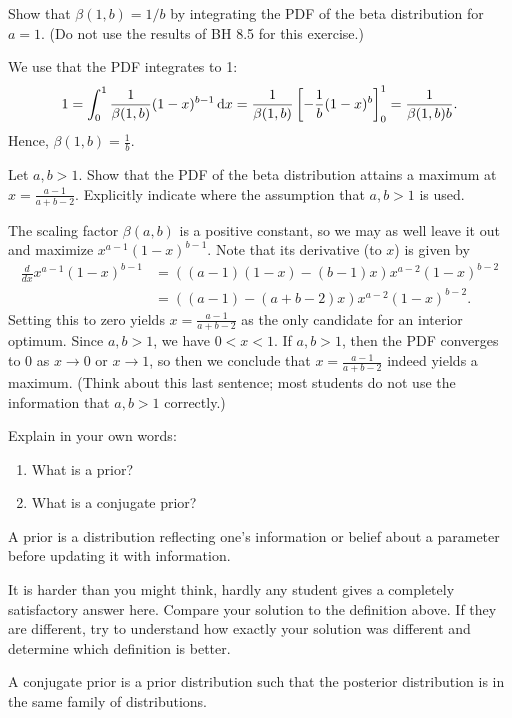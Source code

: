 \begin{exercise}
Show that $\beta(1, b) = 1/b$ by integrating the PDF of the beta distribution for $a=1$. (Do not use the results of BH 8.5 for this exercise.)
\begin{solution}
We use that the PDF integrates to 1:
$$1 = \int_0^1 \frac1{\beta(1,b)} (1-x)^{b-1} \,\textrm{d}x =  \frac1{\beta(1,b)}  \left[-\frac{1}{b}(1-x)^{b}\right]_0^1 =  \frac{1}{\beta(1,b) b}.$$
Hence, $\beta(1, b) = \frac1b$.
\end{solution}
\end{exercise}

\begin{exercise}
Let $a, b > 1$. Show that the PDF of the beta distribution attains a maximum at $x = \frac{a-1}{a+b-2}$. Explicitly indicate where the assumption that  $a, b > 1$ is used.
\begin{solution}
The scaling factor $\beta(a, b)$ is a positive constant, so we may as well leave it out and maximize $x^{a-1}(1-x)^{b-1}$. Note that its derivative (to $x$) is given by
\begin{align*}
\frac{d}{dx} x^{a-1}(1-x)^{b-1} &= ((a-1)(1-x) -(b-1)x)x^{a-2}(1-x)^{b-2} \\ &= ((a-1) - (a+b-2)x) x^{a-2}(1-x)^{b-2}.
\end{align*}
Setting this to zero yields $x = \frac{a-1}{a+b-2}$ as the only candidate for an interior optimum. Since $a, b > 1$, we have $0 < x < 1$. If  $a, b > 1$, then the PDF converges to 0 as $x \to 0$ or $x \to 1$, so then we conclude that $x = \frac{a-1}{a+b-2}$ indeed yields a maximum. (Think about this last sentence; most students do not use the information that $a,b>1$ correctly.)
\end{solution}
\end{exercise}


\begin{exercise}
Explain in your own words:
\begin{enumerate}
\item What is a prior?
\item What is a conjugate prior?
\end{enumerate}
\begin{solution}
A prior is a distribution reflecting one's information or belief about a parameter before updating it with information.

It is harder than you might think, hardly any student gives a completely satisfactory answer here. Compare your solution to the definition above. If they are different, try to understand how exactly your solution was different and determine which definition is better.

A conjugate prior is a prior distribution such that the posterior distribution is in the same family of distributions.
\end{solution}
\end{exercise}


